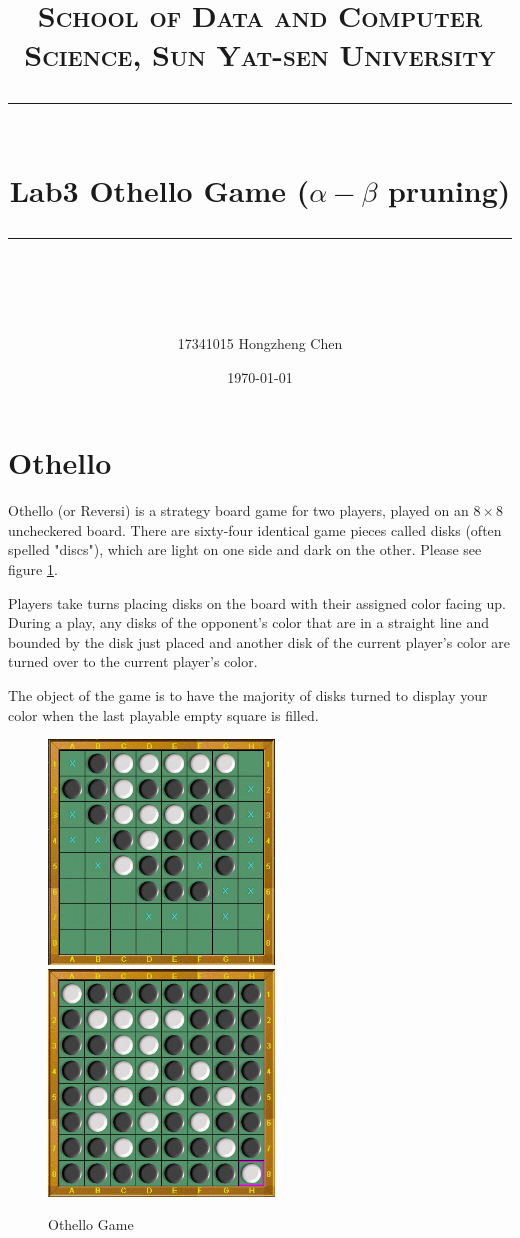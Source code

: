 ﻿\documentclass[a4paper, 11pt]{article}
\title{
\normalfont \normalsize
\textsc{School of Data and Computer Science, Sun Yat-sen University} \\ [25pt] %
\rule{\textwidth}{0.5pt} \\[0.4cm] %
\huge  Lab3 Othello Game ($\alpha-\beta$ pruning) \\ %
\rule{\textwidth}{2pt} \\[0.5cm] %
\author{17341015 Hongzheng Chen}
\date{\normalsize\today}
}
\begin{document}
\maketitle
\tableofcontents
\newpage

\section{Othello}
Othello (or Reversi) is a strategy board game for two players, played on an $8 \times 8$ uncheckered board. There are sixty-four identical game pieces called disks (often spelled "discs"), which are light on one side and dark on the other. Please see figure \ref{fig:othello}.

Players take turns placing disks on the board with their assigned color facing up. During a play, any disks of the opponent's color that are in a straight line and bounded by the disk just placed and another disk of the current player's color are turned over to the current player's color.

The object of the game is to have the majority of disks turned to display your color when the last playable empty square is filled.
\begin{figure}
  \centering
  \includegraphics[width=6cm]{fig/othello}
  \qquad
  \includegraphics[width=6cm]{fig/othello2}
  \caption{Othello Game}
  \label{fig:othello}
\end{figure}
\end{document}
